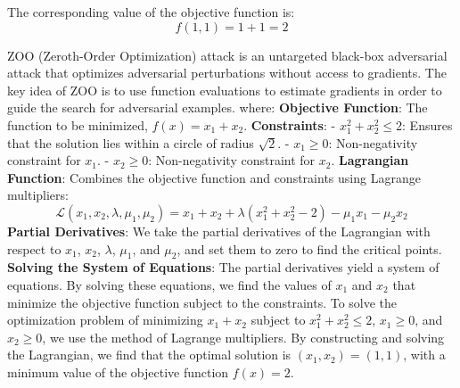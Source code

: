 The corresponding value of the objective function is:
\[
f(1, 1) = 1 + 1 = 2
\]

ZOO (Zeroth-Order Optimization) attack is an untargeted black-box adversarial attack that optimizes adversarial perturbations without access to gradients. The key idea of ZOO is to use function evaluations to estimate gradients in order to guide the search for adversarial examples. where:
\textbf{Objective Function}: The function to be minimized, \( f(x) = x_1 + x_2 \).
\textbf{Constraints}:
    - \( x_1^2 + x_2^2 \leq 2 \): Ensures that the solution lies within a circle of radius \(\sqrt{2}\).
    - \( x_1 \geq 0 \): Non-negativity constraint for \( x_1 \).
    - \( x_2 \geq 0 \): Non-negativity constraint for \( x_2 \).
\textbf{Lagrangian Function}: Combines the objective function and constraints using Lagrange multipliers:
    \[
    \mathcal{L}(x_1, x_2, \lambda, \mu_1, \mu_2) = x_1 + x_2 + \lambda (x_1^2 + x_2^2 - 2) - \mu_1 x_1 - \mu_2 x_2
    \]
\textbf{Partial Derivatives}: We take the partial derivatives of the Lagrangian with respect to \( x_1 \), \( x_2 \), \( \lambda \), \( \mu_1 \), and \( \mu_2 \), and set them to zero to find the critical points.
\textbf{Solving the System of Equations}: The partial derivatives yield a system of equations. By solving these equations, we find the values of \( x_1 \) and \( x_2 \) that minimize the objective function subject to the constraints. To solve the optimization problem of minimizing \( x_1 + x_2 \) subject to \( x_1^2 + x_2^2 \leq 2 \), \( x_1 \geq 0 \), and \( x_2 \geq 0 \), we use the method of Lagrange multipliers. By constructing and solving the Lagrangian, we find that the optimal solution is \( (x_1, x_2) = (1, 1) \), with a minimum value of the objective function \( f(x) = 2 \).
